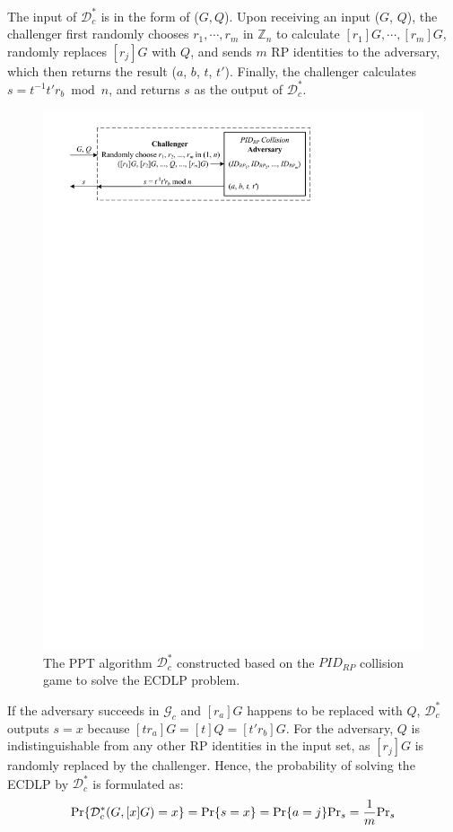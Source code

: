 The input of $\mathcal{D}^*_c$ is in the form of ($G, Q$).
Upon receiving an input ($G$, $Q$), the challenger first randomly chooses $r_1, \cdots, r_m$ in $\mathbb{Z}_n$ to calculate $[r_1]G, \cdots, [r_m]G$, randomly replaces $[r_j]G$ with $Q$, and sends $m$ RP identities to the adversary, which then returns the result ($a$, $b$, $t$, $t'$).
Finally, the challenger calculates $s = t^{-1}t'r_b \bmod n$, and returns $s$ as the output of $\mathcal{D}^*_c$.

\begin{figure}[tb]
  \centering
  \includegraphics[width=0.97\linewidth]{fig/ecdlp_algorithm.pdf}
  \caption{The PPT algorithm $\mathcal{D}^*_c$ constructed based on the $PID_{RP}$ collision game to solve the ECDLP problem.}
  \label{fig:ecdlp_algorithm}
\end{figure}

If the adversary succeeds in $\mathcal{G}_c$ and $[r_a]G$ happens to be replaced with $Q$,
 $\mathcal{D}^*_c$ outputs $s=x$ because $[tr_a]G = [t]Q = [t'r_b]G$. For the adversary, $Q$ is indistinguishable from any other RP identities in the input set, as $[r_j]G$ is randomly replaced by the challenger.
Hence, the probability of solving the ECDLP by $\mathcal{D}^*_c$ is formulated as:
\begin{equation*}
{\rm Pr}\{\mathcal{D}^*_c(G, [x]G)=x\} = {\rm Pr}\{s = x\}={\rm Pr}\{a=j\}{\rm Pr}_s=\frac{1}{m}{\rm Pr}_s
\end{equation*}

